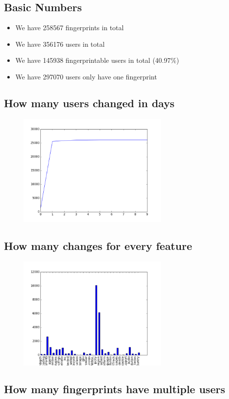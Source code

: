 \documentclass[10pt, conference, compsocconf]{IEEEtran}
\begin{document}
\subsection{Basic Numbers}
\begin{itemize}\item We have 258567 fingerprints in total\item We have 356176 users in total\item We have 145938 fingerprintable users in total (40.97\%)\item We have 297070 users only have one fingerprint \end{itemize}\subsection{How many users changed in days}
\begin{figure}[H]\centering\includegraphics[width=75mm,scale=0.5]{BasedonCookiechangebytime}\end{figure}\subsection{How many changes for every feature}
\begin{figure}[H]\centering\includegraphics[width=75mm,scale=0.5]{BasedonCookiefeaturechange}\end{figure}\subsection{How many fingerprints have multiple users}
\end{document}
